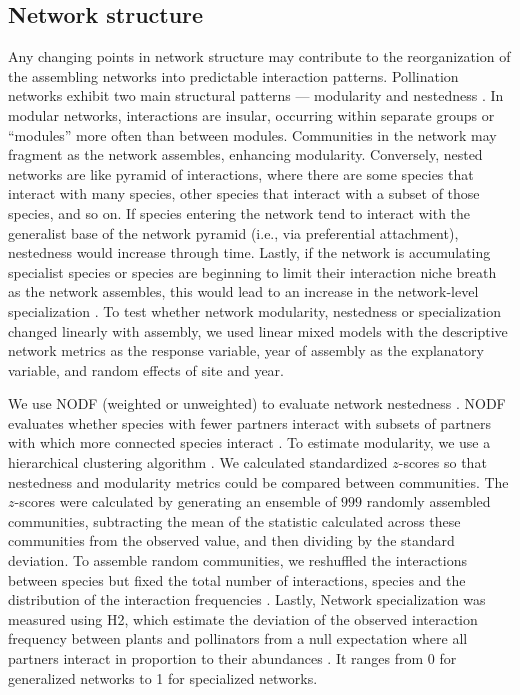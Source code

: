 \documentclass[12pt]{article}
\begin{document}
\subsection*{Network structure}
Any changing points in network structure may contribute to the
reorganization of the assembling networks into predictable interaction
patterns. Pollination networks exhibit two main structural patterns
--- modularity \citep[e.g.,][]{Olesen2007} and nestedness
\citep[e.g.,][]{Bascompte2006, Bascompte2003}. In modular networks,
interactions are insular, occurring within separate groups or
``modules'' more often than between modules. Communities in the
network may fragment as the network assembles, enhancing
modularity. Conversely, nested networks are like pyramid of
interactions, where there are some species that interact with many
species, other species that interact with a subset of those species,
and so on. If species entering the network tend to interact with the
generalist base of the network pyramid (i.e., via preferential
attachment), nestedness would increase through time. Lastly, if the
network is accumulating specialist species or species are beginning to
limit their interaction niche breath as the network assembles, this
would lead to an increase in the network-level specialization
\citep{bluthgen-2006-9}. To test whether network modularity,
nestedness or specialization changed linearly with assembly, we used
linear mixed models with the descriptive network metrics as the
response variable, year of assembly as the explanatory variable, and
random effects of site and year.

We use NODF (weighted or unweighted) to evaluate network nestedness
\citep{nodf}. NODF evaluates whether species with fewer partners
interact with subsets of partners with which more connected species
interact \citep{nodf}. To estimate modularity, we use a hierarchical
clustering algorithm \citep{Newman2004, igraph}.  We calculated
standardized $z$-scores so that nestedness and modularity metrics
could be compared between communities. The $z$-scores were calculated
by generating an ensemble of $999$ randomly assembled communities,
subtracting the mean of the statistic calculated across these
communities from the observed value, and then dividing by the standard
deviation. To assemble random communities, we reshuffled the
interactions between species but fixed the total number of
interactions, species and the distribution of the interaction
frequencies \citep{Galeano2009}. Lastly, Network specialization was
measured using H2, which estimate the deviation of the observed
interaction frequency between plants and pollinators from a null
expectation where all partners interact in proportion to their
abundances \citep{bluthgen-2006-9}. It ranges from 0 for generalized
networks to 1 for specialized networks.
\end{document}
